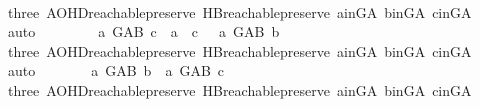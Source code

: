\begin{isabellebody}
\ \ \ \ \ \ \isamarkupfalse%
\ three\ AOHD{\isachardot}{\kern0pt}reachable{}{\isacharunderscore}{\kern0pt}preserve\ HB{}{\isachardot}{\kern0pt}reachable{}{\isacharunderscore}{\kern0pt}preserve\ a{\isacharunderscore}{\kern0pt}in{\isacharunderscore}{\kern0pt}G{\isacharunderscore}{\kern0pt}A\ b{\isacharunderscore}{\kern0pt}in{\isacharunderscore}{\kern0pt}G{\isacharunderscore}{\kern0pt}A\ c{\isacharunderscore}{\kern0pt}in{\isacharunderscore}{\kern0pt}G{\isacharunderscore}{\kern0pt}A\ \isamarkupfalse%
\ auto\isanewline
\ \ \ \ \isamarkupfalse%
\ \isamarkupfalse%
\ {\isachardoublequoteopen}{\isasymnot}\ {\isacharparenleft}{\kern0pt}{\isacharparenleft}{\kern0pt}a\ {\isasymrightarrow}\isactrlsup {\isacharplus}{\kern0pt}\isactrlbsub G{\isacharunderscore}{\kern0pt}AB\isactrlesub \ c\ {\isasymor}\ a\ {\isacharequal}{\kern0pt}\ c{\isacharparenright}{\kern0pt}\ {\isasymand}\ {\isacharparenleft}{\kern0pt}{\isasymnot}\ a\ {\isasymrightarrow}\isactrlsup {\isacharplus}{\kern0pt}\isactrlbsub G{\isacharunderscore}{\kern0pt}AB\isactrlesub \ b{\isacharparenright}{\kern0pt}{\isacharparenright}{\kern0pt}{\isachardoublequoteclose}\ \isanewline
\ \ \ \ \ \ \isamarkupfalse%
\ three\ AOHD{\isachardot}{\kern0pt}reachable{}{\isacharunderscore}{\kern0pt}preserve\ HB{}{\isachardot}{\kern0pt}reachable{}{\isacharunderscore}{\kern0pt}preserve\ a{\isacharunderscore}{\kern0pt}in{\isacharunderscore}{\kern0pt}G{\isacharunderscore}{\kern0pt}A\ b{\isacharunderscore}{\kern0pt}in{\isacharunderscore}{\kern0pt}G{\isacharunderscore}{\kern0pt}A\ c{\isacharunderscore}{\kern0pt}in{\isacharunderscore}{\kern0pt}G{\isacharunderscore}{\kern0pt}A\ \isamarkupfalse%
\ auto\isanewline
\ \ \ \ \isamarkupfalse%
\ \isamarkupfalse%
\ {\isachardoublequoteopen}a\ {\isasymrightarrow}\isactrlsup {\isacharplus}{\kern0pt}\isactrlbsub G{\isacharunderscore}{\kern0pt}AB\isactrlesub \ b\ {\isasymand}\ a\ {\isasymrightarrow}\isactrlsup {\isacharplus}{\kern0pt}\isactrlbsub G{\isacharunderscore}{\kern0pt}AB\isactrlesub \ c{\isachardoublequoteclose}\ \isanewline
\ \ \ \ \ \ \isamarkupfalse%
\ three\ AOHD{\isachardot}{\kern0pt}reachable{}{\isacharunderscore}{\kern0pt}preserve\ HB{}{\isachardot}{\kern0pt}reachable{}{\isacharunderscore}{\kern0pt}preserve\ a{\isacharunderscore}{\kern0pt}in{\isacharunderscore}{\kern0pt}G{\isacharunderscore}{\kern0pt}A\ b{\isacharunderscore}{\kern0pt}in{\isacharunderscore}{\kern0pt}G{\isacharunderscore}{\kern0pt}A\ c{\isacharunderscore}{\kern0pt}in{\isacharunderscore}{\kern0pt}G{\isacharunderscore}{\kern0pt}A\ \isamarkupfalse%

\end{isabellebody}
